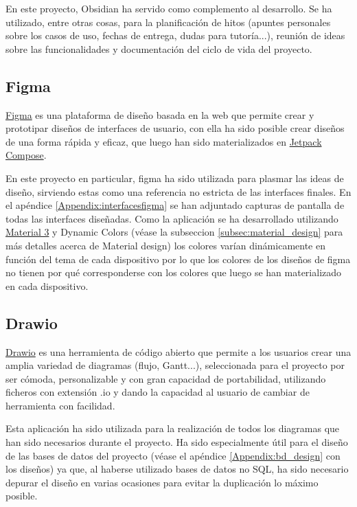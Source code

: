 En este proyecto, Obsidian ha servido como complemento al desarrollo. Se ha utilizado, entre otras cosas, para la planificación de hitos (apuntes personales sobre los casos de uso, fechas de entrega, dudas para tutoría...), reunión de ideas sobre las funcionalidades y documentación del ciclo de vida del proyecto.

\hypertarget{subsec:figma}{}
\subsection{Figma}
\href{https://www.figma.com}{Figma} es una plataforma de diseño basada en la web que permite crear y prototipar diseños de interfaces de usuario, con ella ha sido posible crear diseños de una forma rápida y eficaz, que luego han sido materializados en \hyperlink{subsec:compose}{Jetpack Compose}. 

En este proyecto en particular, figma ha sido utilizada para plasmar las ideas de diseño, sirviendo estas como una referencia no estricta de las interfaces finales. En el apéndice \ref{Appendix:interfacesfigma} se han adjuntado capturas de pantalla de todas las interfaces diseñadas. Como la aplicación se ha desarrollado utilizando \href{https://m3.material.io/}{Material 3} y Dynamic Colors (véase la subseccion \ref{subsec:material_design} para más detalles acerca de Material design) los colores varían dinámicamente en función del tema de cada dispositivo por lo que los colores de los diseños de figma no tienen por qué corresponderse con los colores que luego se han materializado en cada dispositivo.
\hypertarget{subsec:drawio}{}
\subsection{Drawio}
\href{https://www.drawio.com/}{Drawio} es una herramienta de código abierto que permite a los usuarios crear una amplia variedad de diagramas (flujo, Gantt...), seleccionada para el proyecto por ser cómoda, personalizable y con gran capacidad de portabilidad, utilizando ficheros con extensión .io y dando la capacidad al usuario de cambiar de herramienta con facilidad. 

Esta aplicación ha sido utilizada para la realización de todos los diagramas que han sido necesarios durante el proyecto. Ha sido especialmente útil para el diseño de las bases de datos del proyecto (véase el apéndice \ref{Appendix:bd_design} con los diseños) ya que, al haberse utilizado bases de datos no SQL, ha sido necesario depurar el diseño en varias ocasiones para evitar la duplicación lo máximo posible.


